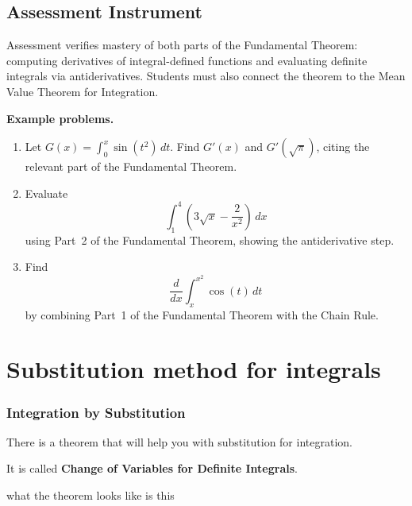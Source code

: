 \subsection{Assessment Instrument}
\label{ssec:thef-0933}

Assessment verifies mastery of both parts of the Fundamental Theorem: computing derivatives of integral-defined functions and evaluating definite integrals via antiderivatives. Students must also connect the theorem to the Mean Value Theorem for Integration.

\textbf{Example problems.}

\begin{enumerate}
    \item Let $G(x) = \int_0^x \sin(t^2)\,dt$. 
    Find $G'(x)$ and $G'(\sqrt{\pi})$, citing the relevant part of the Fundamental Theorem.
    
    \item Evaluate 
    \[
    \int_1^4 \left(3\sqrt{x} - \frac{2}{x^2}\right)\,dx
    \]
    using Part~2 of the Fundamental Theorem, showing the antiderivative step.
    
    \item Find 
    \[
    \frac{d}{dx}\int_{x}^{x^2}\cos(t)\,dt
    \]
    by combining Part~1 of the Fundamental Theorem with the Chain Rule.
\end{enumerate}


\section{Substitution method for integrals}
\label{sec:subs-b663}


\subsubsection{Integration by Substitution}
\label{sss:inte-6921}


There is a theorem that will help you with substitution for integration.

It is called \textbf{Change of Variables for Definite Integrals}.


what the theorem looks like is this


